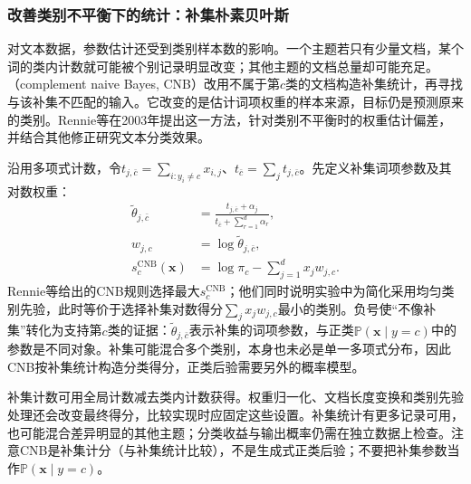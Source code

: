 \subsubsection{改善类别不平衡下的统计：补集朴素贝叶斯}
\label{sec:classification-naive-bayes-complement}

对文本数据，参数估计还受到类别样本数的影响。一个主题若只有少量文档，某个词的类内计数就可能被个别记录明显改变；其他主题的文档总量却可能充足。（complement naive Bayes, CNB）改用不属于第$c$类的文档构造补集统计，再寻找与该补集不匹配的输入。它改变的是估计词项权重的样本来源，目标仍是预测原来的类别。Rennie等在2003年提出这一方法，针对类别不平衡时的权重估计偏差，并结合其他修正研究文本分类效果。

沿用多项式计数，令$t_{j,\bar c}=\sum_{i:y_i\neq c}x_{i,j}$、$t_{\bar c}=\sum_jt_{j,\bar c}$。先定义补集词项参数及其对数权重：
\begin{equation}
  \label{eq:classification-complement-nb}
  \begin{aligned}
    \tilde\theta_{j,\bar c}
      &=\frac{t_{j,\bar c}+\alpha_j}
              {t_{\bar c}+\sum_{r=1}^{d}\alpha_r},\\
    w_{j,c}&=\log\tilde\theta_{j,\bar c},\\
    s_c^{\mathrm{CNB}}(\bm{x})
      &=\log\pi_c-\sum_{j=1}^{d}x_jw_{j,c}.
  \end{aligned}
\end{equation}
Rennie等给出的CNB规则选择最大$s_c^{\mathrm{CNB}}$；他们同时说明实验中为简化采用均匀类别先验，此时等价于选择补集对数得分$\sum_jx_jw_{j,c}$最小的类别。负号使“不像补集”转化为支持第$c$类的证据：$\tilde\theta_{j,\bar c}$表示补集的词项参数，与正类$\mathbb{P}(\bm{x}\mid y=c)$中的参数是不同对象。补集可能混合多个类别，本身也未必是单一多项式分布，因此CNB按补集统计构造分类得分，正类后验需要另外的概率模型。

补集计数可用全局计数减去类内计数获得。权重归一化、文档长度变换和类别先验处理还会改变最终得分，比较实现时应固定这些设置。补集统计有更多记录可用，也可能混合差异明显的其他主题；分类收益与输出概率仍需在独立数据上检查。注意CNB是补集计分（与补集统计比较），不是生成式正类后验；不要把补集参数当作$\mathbb{P}(\bm{x}\mid y=c)$。
